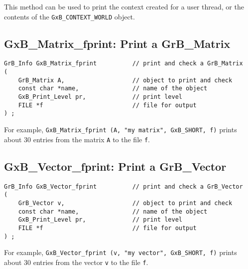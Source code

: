 \documentclass[12pt]{article}
\begin{document}
This method can be used to print the context created for a user thread,
or the contents of the \verb'GxB_CONTEXT_WORLD' object.

\subsection{{\sf GxB\_Matrix\_fprint:} Print a {\sf GrB\_Matrix}}

\begin{mdframed}[userdefinedwidth=6in]
{\footnotesize
\begin{verbatim}
GrB_Info GxB_Matrix_fprint          // print and check a GrB_Matrix
(
    GrB_Matrix A,                   // object to print and check
    const char *name,               // name of the object
    GxB_Print_Level pr,             // print level
    FILE *f                         // file for output
) ;
\end{verbatim} } \end{mdframed}

For example, \verb'GxB_Matrix_fprint (A, "my matrix", GxB_SHORT, f)'
prints about 30 entries from the matrix \verb'A' to the file \verb'f'.


\newpage
\subsection{{\sf GxB\_Vector\_fprint:} Print a {\sf GrB\_Vector}}

\begin{mdframed}[userdefinedwidth=6in]
{\footnotesize
\begin{verbatim}
GrB_Info GxB_Vector_fprint          // print and check a GrB_Vector
(
    GrB_Vector v,                   // object to print and check
    const char *name,               // name of the object
    GxB_Print_Level pr,             // print level
    FILE *f                         // file for output
) ;
\end{verbatim} } \end{mdframed}

For example, \verb'GxB_Vector_fprint (v, "my vector", GxB_SHORT, f)'
prints about 30 entries from the vector \verb'v' to the file \verb'f'.
\end{document}
